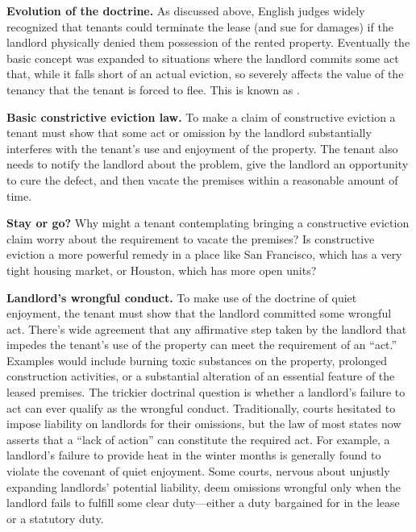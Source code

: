 
\item \textbf{Evolution of the doctrine.}  As discussed above, English judges
widely recognized that tenants could terminate the lease (and sue for damages)
if the landlord physically denied them possession of the rented property. 
Eventually the basic concept was expanded to situations where the landlord
commits some act that, while it falls short of an actual eviction, so severely
affects the value of the tenancy that the tenant is forced to flee.  This is
known as .  


\item \textbf{Basic constrictive eviction law.} To make a claim of constructive
eviction a tenant must show that some act or omission by the landlord
substantially interferes with the tenant's use and enjoyment of the property. 
The tenant also needs to notify the landlord about the problem, give the
landlord an opportunity to cure the defect, and then vacate the premises within
a reasonable amount of time.


\item \textbf{Stay or go?} Why might a tenant contemplating bringing a
constructive eviction claim worry about the requirement to vacate the premises?
 Is constructive eviction a more powerful remedy in a place like San Francisco,
which has a very tight housing market, or Houston, which has more open units?  


\item \textbf{Landlord's wrongful conduct.}  To make use of the doctrine of
quiet enjoyment, the tenant must show that the landlord committed some wrongful
act.  There's wide agreement that any affirmative step taken by the landlord
that impedes the tenant's use of the property can meet the requirement of an
``act.''  Examples would include burning toxic substances on the property,
prolonged construction activities, or a substantial alteration of an essential
feature of the leased premises.  The trickier doctrinal question is whether a
landlord's failure to act can ever qualify as the wrongful conduct. 
Traditionally, courts hesitated to impose liability on landlords for their
omissions, but the law of most states now asserts that a ``lack of action'' can
constitute the required act. For example, a landlord's failure to provide heat
in the winter months is generally found to violate the covenant of quiet
enjoyment. Some courts, nervous about unjustly expanding landlords' potential
liability, deem omissions wrongful only when the landlord fails to fulfill some
clear duty---either a duty bargained for in the lease or a statutory duty.


